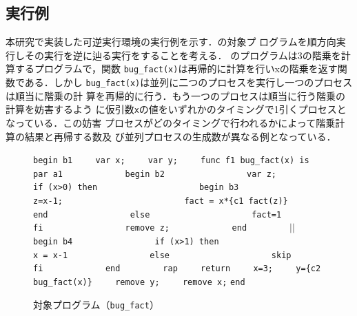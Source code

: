 \documentclass[submit,PRO]{ipsj}
\def\|{\verb|}
\begin{document}
\subsection{実行例}

本研究で実装した可逆実行環境の実行例を示す．の対象プ
ログラムを順方向実行しその実行を逆に辿る実行をすることを考える．
のプログラムは3の階乗を計算するプログラムで，関数
\texttt{bug\_fact(x)}は再帰的に計算を行いxの階乗を返す関数である．しかし
\texttt{bug\_fact(x)}は並列に二つのプロセスを実行し一つのプロセスは順当に階乗の計
算を再帰的に行う．もう一つのプロセスは順当に行う階乗の計算を妨害するよう
に仮引数\texttt{x}の値をいずれかのタイミングで1引くプロセスとなっている．この妨害
プロセスがどのタイミングで行われるかによって階乗計算の結果と再帰する数及
び並列プロセスの生成数が異なる例となっている．

\begin{figure}[tb]
\vbox{
\hbox{\|begin b1|}
\hbox{\|    var x;|}
\hbox{\|    var y;|}
\hbox{\|    func f1 bug_fact(x) is|}
\hbox{\|        par a1|}
\hbox{\|            begin b2|}
\hbox{\|                var z;|}
\hbox{\|                if (x>0) then|}
\hbox{\|                    begin b3|}
\hbox{\|                        z=x-1;|}
\hbox{\|                        fact = x*{c1 fact(z)}|}
\hbox{\|                    end|}
\hbox{\|                else|}
\hbox{\|                    fact=1|}
\hbox{\|                fi|}
\hbox{\|                remove z;|}
\hbox{\|            end|}
\hbox{\|        |$||$\|  begin b4|}
\hbox{\|                if (x>1) then|}
\hbox{\|                    x = x-1|}
\hbox{\|                else|}
\hbox{\|                    skip|}
\hbox{\|                fi|}
\hbox{\|            end|}
\hbox{\|        rap|}
\hbox{\|    return|}
\hbox{\|    x=3;|}
\hbox{\|    y={c2 bug_fact(x)}|}
\hbox{\|    remove y;|}
\hbox{\|    remove x;|}
\hbox{\|end|}
}
\centerline{}
\caption{対象プログラム（\texttt{bug\_fact}）}
\label{fig:target}
\end{figure}
\end{document}
